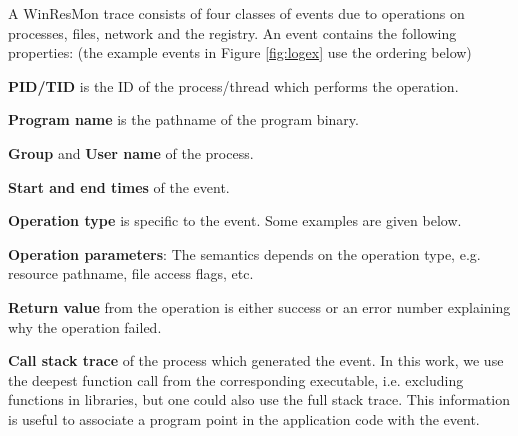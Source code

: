 A WinResMon trace consists of four classes of events
due to operations on processes, files, network and the registry.
An event contains the following properties: (the example events
in Figure \ref{fig:logex} use the ordering below)
\begin{tightitemize}
\item {\bf PID/TID} is the ID of the process/thread which
performs the operation.
\item {\bf Program name} is the pathname of the program binary.
\item {\bf Group} and {\bf User name} of the process.
\item {\bf Start and end times} of the event.
\item {\bf Operation type} is specific to the event.
Some examples are given below.
\item {\bf Operation parameters}: The semantics depends on the operation type,
e.g.  resource pathname, file access flags, etc.
\item {\bf Return value} from the operation
is either success or an error number explaining why the operation failed.
\item {\bf Call stack trace} of the process which generated the event.
In this work, we use the deepest function call
from the corresponding executable, i.e.
excluding functions in libraries,
but one could also use the full stack trace.
This information is useful to associate a program point in the
application code with the event.
\end{tightitemize}

